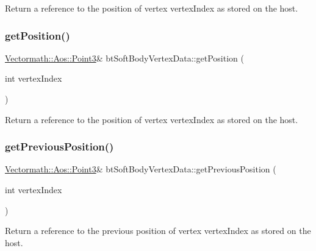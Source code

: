 Return a reference to the position of vertex vertex\+Index as stored on the host. \mbox{\label{classbtSoftBodyVertexData_ac5d2dd4b383b386080c45a4fcf45f4f4}} 
\subsubsection{\texorpdfstring{get\+Position()}{getPosition()}\hspace{0.1cm}{\footnotesize\ttfamily [2/2]}}
{\footnotesize\ttfamily \hyperlink{classVectormath_1_1Aos_1_1Point3}{Vectormath\+::\+Aos\+::\+Point3}\& bt\+Soft\+Body\+Vertex\+Data\+::get\+Position (\begin{DoxyParamCaption}\item[{int}]{vertex\+Index }\end{DoxyParamCaption})\hspace{0.3cm}{\ttfamily [inline]}}

Return a reference to the position of vertex vertex\+Index as stored on the host. \mbox{\label{classbtSoftBodyVertexData_a123a978bf93f1ea06263b157e433ad97}} 
\subsubsection{\texorpdfstring{get\+Previous\+Position()}{getPreviousPosition()}\hspace{0.1cm}{\footnotesize\ttfamily [1/2]}}
{\footnotesize\ttfamily \hyperlink{classVectormath_1_1Aos_1_1Point3}{Vectormath\+::\+Aos\+::\+Point3}\& bt\+Soft\+Body\+Vertex\+Data\+::get\+Previous\+Position (\begin{DoxyParamCaption}\item[{int}]{vertex\+Index }\end{DoxyParamCaption})\hspace{0.3cm}{\ttfamily [inline]}}

Return a reference to the previous position of vertex vertex\+Index as stored on the host. \mbox{\label{classbtSoftBodyVertexData_a123a978bf93f1ea06263b157e433ad97}} 
